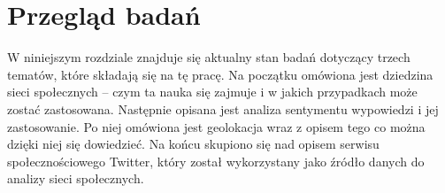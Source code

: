 \chapter{Przegląd badań}
\label{chapter:przegladbadan}

W niniejszym rozdziale znajduje się aktualny stan badań dotyczący trzech
tematów, które składają się na tę pracę. Na początku omówiona jest dziedzina
sieci społecznych -- czym ta nauka się zajmuje i w jakich przypadkach może
zostać zastosowana.
Następnie opisana jest analiza sentymentu wypowiedzi i jej zastosowanie.
Po niej omówiona jest geolokacja wraz z opisem tego co można dzięki niej się
dowiedzieć.
Na końcu skupiono się nad opisem serwisu społecznościowego Twitter, który
został wykorzystany jako źródło danych do analizy sieci społecznych.








